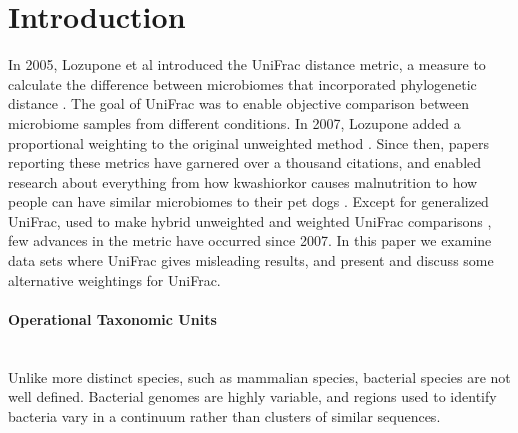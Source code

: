\documentclass[10pt,letterpaper]{article}
\begin{document}

\linenumbers

\section*{Introduction}
In 2005, Lozupone et al introduced the UniFrac distance metric, a measure to calculate the difference between microbiomes that incorporated phylogenetic distance \cite{lozupone2005unifrac}. The goal of UniFrac was to enable objective comparison between microbiome samples from different conditions. In 2007, Lozupone added a proportional weighting to the original unweighted method \cite{lozupone2007quantitative}. Since then, papers reporting these metrics have garnered over a thousand citations, and enabled research about everything from how kwashiorkor causes malnutrition \cite{smith2013gut} to how people can have similar microbiomes to their pet dogs \cite{song2013cohabiting}. Except for generalized UniFrac, used to make hybrid unweighted and weighted UniFrac comparisons \cite{chen2012associating}, few advances in the metric have occurred since 2007. In this paper we examine data sets where UniFrac gives misleading results, and present and discuss some alternative weightings for UniFrac.

\paragraph{Operational Taxonomic Units}\mbox{}\\
Unlike more distinct species, such as mammalian species, bacterial species are not well defined. Bacterial genomes are highly variable, and regions used to identify bacteria vary in a continuum rather than clusters of similar sequences.
\end{document}
